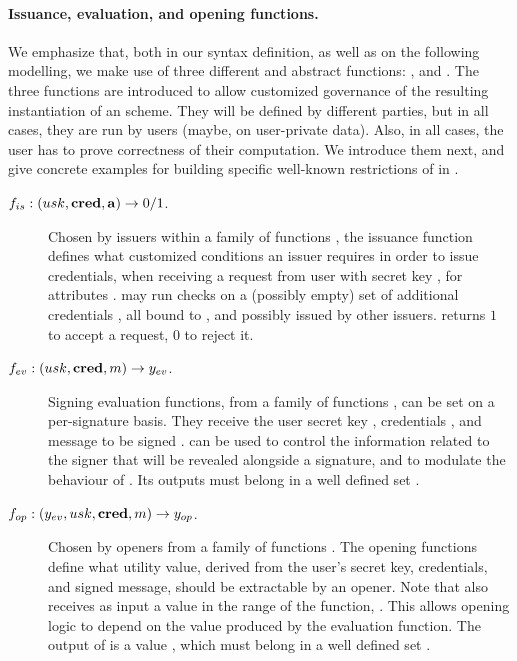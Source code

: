 \paragraph{Issuance, evaluation, and opening functions.} %
We emphasize that, both in our syntax definition, as well as on the following
modelling, we make use of three different and abstract functions: \fissue,
\feval and \finsp. The three functions are introduced to allow customized
governance of the resulting instantiation of an \UAS scheme. They will be
defined by different parties, but in all cases, they are run by users (maybe,
on user-private data). Also, in all cases, the user has to prove correctness of
their computation. We introduce them next, and give concrete examples for
building specific well-known restrictions of \UAS in
.

\begin{description}
\item[$f_{is}: (usk,\mathbf{cred},\mathbf{a})
  \rightarrow 0/1$.] Chosen by issuers within a family of functions \famfissue,
  the issuance function defines what customized conditions an issuer requires
  in order to issue credentials, when receiving a request from user with secret
  key \usk, for attributes \attrs. \fissue may run checks on a (possibly empty)
  set of additional credentials \scred, all bound to \usk, and possibly
  issued by other issuers. \fissue returns $1$ to accept a request, $0$ to
  reject it.
\item[$f_{ev}: (usk,\mathbf{cred},m)
  \rightarrow y_{ev}$.] Signing evaluation functions, from a family of functions
  \famfeval, can be set on a per-signature basis. They receive the user secret
  key \usk, credentials \scred, and message to be signed \msg. \feval can be
  used to control the information related to the signer that will be revealed
  alongside a signature, and to modulate the behaviour of \finsp. Its outputs
  \yeval must belong in a well defined set \rngfeval.
\item[$f_{op}: (y_{ev},usk,\mathbf{cred},m) \rightarrow y_{op}$.]
  Chosen by openers from a family of functions \famfinsp. The opening
  functions define what utility value, derived from the user's secret key,
  credentials, and signed message, should be extractable by an opener.
  Note that \finsp also receives as input a value in the range of the \feval
  function, \rngfeval. This allows opening logic to depend on the value
  produced by the evaluation function. The output of \finsp is a value
  \yinsp, which must belong in a well defined set \rngfinsp.
\end{description}

